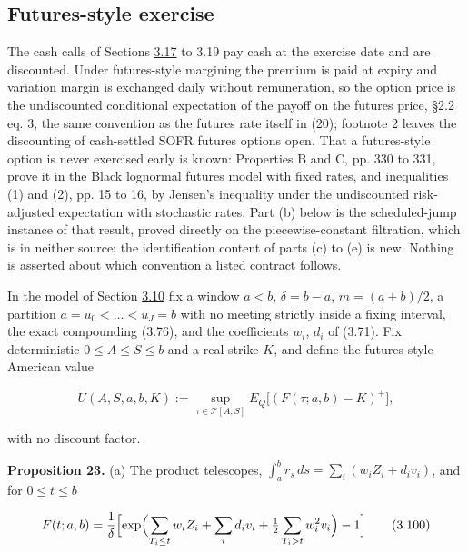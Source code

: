 \documentclass[11pt]{article}
\begin{document}
\subsection{Futures-style exercise}\label{sec:3.20}

The cash calls of Sections \hyperref[sec:3.17]{3.17} to 3.19 pay cash at the exercise date and are discounted. Under futures-style margining the premium is paid at expiry and variation margin is exchanged daily without remuneration, so the option price is the undiscounted conditional expectation of the payoff on the futures price, \cite{nastasi2018smile} §2.2 eq. 3, the same convention as the futures rate itself in \cite{skov2021dynamic} (20); \cite{itkin2024semi} footnote 2 leaves the discounting of cash-settled SOFR futures options open. That a futures-style option is never exercised early is known: \cite{lieu1990option} Properties B and C, pp. 330 to 331, prove it in the Black lognormal futures model with fixed rates, and \cite{chen1993pricing} inequalities (1) and (2), pp. 15 to 16, by Jensen's inequality under the undiscounted risk-adjusted expectation with stochastic rates. Part (b) below is the scheduled-jump instance of that result, proved directly on the piecewise-constant filtration, which is in neither source; the identification content of parts (c) to (e) is new. Nothing is asserted about which convention a listed contract follows.

In the model of Section \hyperref[sec:3.10]{3.10} fix a window \(a < b\), \(\delta = b - a\), \(m = (a + b)/2\), a partition \(a = u_0 < \dots < u_J = b\) with no meeting strictly inside a fixing interval, the exact compounding (3.76), and the coefficients \(w_i\), \(d_i\) of (3.71). Fix deterministic \(0 \le A \le S \le b\) and a real strike \(K\), and define the futures-style American value

\begin{equation*}
\tilde U(A, S, a, b, K) := \sup_{\tau \in \mathcal T[A, S]} E_Q\bigl[ (F(\tau; a, b) - K)^+ \bigr], \tag{3.99}\label{eq:3.99}
\end{equation*}

with no discount factor.

\label{res:Proposition-23}
\textbf{Proposition 23.} (a) The product telescopes, \(\int_a^b r_s\,ds = \sum_i (w_i Z_i + d_i v_i)\), and for \(0 \le t \le b\)

\begin{equation*}
F(t; a, b) = \frac{1}{\delta} \Bigl[ \exp\Bigl( \sum_{T_i \le t} w_i Z_i + \sum_i d_i v_i + \tfrac12 \sum_{T_i > t} w_i^2 v_i \Bigr) - 1 \Bigr] \tag{3.100}\label{eq:3.100}
\end{equation*}
\end{document}
